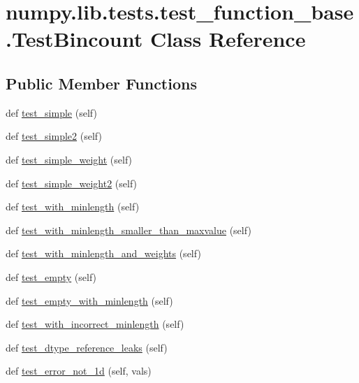 \hypertarget{classnumpy_1_1lib_1_1tests_1_1test__function__base_1_1TestBincount}{}\section{numpy.\+lib.\+tests.\+test\+\_\+function\+\_\+base.\+Test\+Bincount Class Reference}
\label{classnumpy_1_1lib_1_1tests_1_1test__function__base_1_1TestBincount}
\subsection*{Public Member Functions}
\begin{DoxyCompactItemize}
\item 
def \hyperlink{classnumpy_1_1lib_1_1tests_1_1test__function__base_1_1TestBincount_a76ff0e93f23eeb6e6f756fdb0bdbaae6}{test\+\_\+simple} (self)
\item 
def \hyperlink{classnumpy_1_1lib_1_1tests_1_1test__function__base_1_1TestBincount_a5c4846092ea76368f3026881a940e743}{test\+\_\+simple2} (self)
\item 
def \hyperlink{classnumpy_1_1lib_1_1tests_1_1test__function__base_1_1TestBincount_ada6e0b091540e9828063c69bef4f1e21}{test\+\_\+simple\+\_\+weight} (self)
\item 
def \hyperlink{classnumpy_1_1lib_1_1tests_1_1test__function__base_1_1TestBincount_a45aa2ae236b8aba0bae7457efa3c8354}{test\+\_\+simple\+\_\+weight2} (self)
\item 
def \hyperlink{classnumpy_1_1lib_1_1tests_1_1test__function__base_1_1TestBincount_a1381e0450d0b153bce734597e32bc32e}{test\+\_\+with\+\_\+minlength} (self)
\item 
def \hyperlink{classnumpy_1_1lib_1_1tests_1_1test__function__base_1_1TestBincount_afb784e1cf3a0d7b23dc2bc80626f7fe3}{test\+\_\+with\+\_\+minlength\+\_\+smaller\+\_\+than\+\_\+maxvalue} (self)
\item 
def \hyperlink{classnumpy_1_1lib_1_1tests_1_1test__function__base_1_1TestBincount_abf6e7490c5d8cc481b26b8167fe782de}{test\+\_\+with\+\_\+minlength\+\_\+and\+\_\+weights} (self)
\item 
def \hyperlink{classnumpy_1_1lib_1_1tests_1_1test__function__base_1_1TestBincount_abb11a51c76d71062a2114eac9a7fede3}{test\+\_\+empty} (self)
\item 
def \hyperlink{classnumpy_1_1lib_1_1tests_1_1test__function__base_1_1TestBincount_a2448c3c13fa063d9790c903ba2d7f204}{test\+\_\+empty\+\_\+with\+\_\+minlength} (self)
\item 
def \hyperlink{classnumpy_1_1lib_1_1tests_1_1test__function__base_1_1TestBincount_aaed0a9599ef1c3e565b569c4659f3de2}{test\+\_\+with\+\_\+incorrect\+\_\+minlength} (self)
\item 
def \hyperlink{classnumpy_1_1lib_1_1tests_1_1test__function__base_1_1TestBincount_a0d080096b6decf6920dafa636ef9d61d}{test\+\_\+dtype\+\_\+reference\+\_\+leaks} (self)
\item 
def \hyperlink{classnumpy_1_1lib_1_1tests_1_1test__function__base_1_1TestBincount_aed6a314050122fd2fbbfb043f5e8a25e}{test\+\_\+error\+\_\+not\+\_\+1d} (self, vals)
\end{DoxyCompactItemize}
